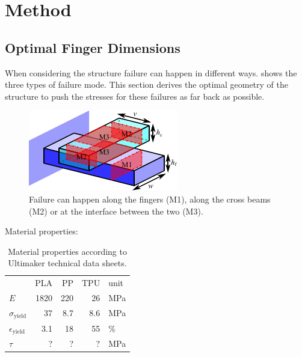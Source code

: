 

\section{Method}


\newpage

\subsection{Optimal Finger Dimensions}
When considering the structure failure can happen in different ways.
 shows the three types of failure mode.
This section derives the optimal geometry of the structure to push the stresses for these failures as far back as possible.


\begin{figure}
	\centering
	\includegraphics[width=.75\columnwidth]{sources/method/failure_modes.pdf}
	\caption{Failure can happen along the fingers (M1), along the cross beams (M2) or at the interface between the two (M3).}
	\label{fig:failure_modes}
\end{figure}



Material properties:
\begin{table}[h!]
	\centering
	\caption{Material properties according to Ultimaker technical data sheets.}
	\label{tab:mat_props}
	\begin{tabular}{lrrrl}
		& PLA & PP & TPU & unit \\
		$E$ & {1820} &  {220} & 26 & \si{\mega\pascal} \\
		$\sigma_\text{yield}$ & {37}& {8.7} & 8.6 & \si{\mega\pascal} \\
		$\epsilon_\text{yield}$ & {3.1}& {18} & 55 & \si{\percent} \\
		$\tau$ & ? & ? & ? & \si{\mega\pascal} \\
	\end{tabular}
\end{table}


